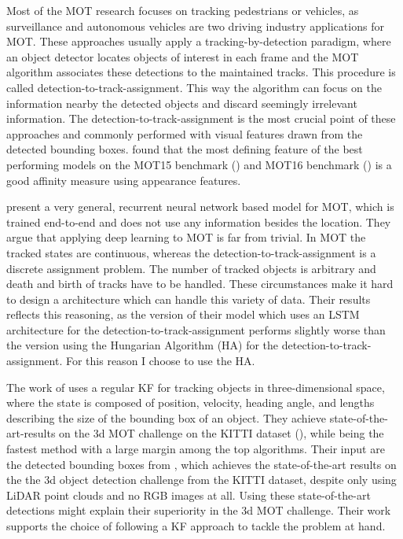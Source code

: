 \documentclass{article}
\begin{document}
Most of the MOT research focuses on tracking pedestrians or vehicles, as surveillance and autonomous vehicles are two driving industry applications for MOT. These approaches usually apply a tracking-by-detection paradigm, where an object detector locates objects of interest in each frame and the MOT algorithm associates these detections to the maintained tracks. This procedure is called detection-to-track-assignment. This way the algorithm can focus on the information nearby the detected objects and discard seemingly irrelevant information. The detection-to-track-assignment is the most crucial point of these approaches and commonly performed with visual features drawn from the detected bounding boxes. \cite{tracking_the_trackers} found  that the most defining feature of the best performing models on the MOT15 benchmark (\cite{MOT15}) and MOT16 benchmark (\cite{MOT16}) is a good affinity measure using appearance features.


\cite{milan_rnn_tracking} present a very general, recurrent neural network based model for MOT, which is trained end-to-end and does not use any information besides the location. They argue that applying deep learning to MOT is far from trivial. In MOT the tracked states are continuous, whereas the detection-to-track-assignment is a discrete assignment problem. The number of tracked objects is arbitrary and death and birth of tracks have to be handled. These circumstances make it hard to design a architecture which can handle this variety of data. Their results reflects this reasoning, as the version of their model which uses an LSTM architecture for the detection-to-track-assignment performs slightly worse than the version using the Hungarian Algorithm (HA) for the detection-to-track-assignment. For this reason I choose to use the HA.

The work of \cite{3d_kalman}  uses a regular KF for tracking objects in three-dimensional space, where the state is composed of position, velocity, heading angle, and lengths describing the size of the bounding box of an object. They achieve state-of-the-art-results on the 3d MOT challenge on the KITTI dataset (\cite{kitti}), while being the fastest method with a large margin among the top algorithms. Their input are the detected bounding boxes from \cite{PointRCNN}, which achieves the state-of-the-art results on the the 3d object detection challenge from the KITTI dataset, despite only using LiDAR point clouds and no RGB images at all. Using these state-of-the-art detections might explain their superiority in the 3d MOT challenge. Their work supports the choice of following a KF approach to tackle the problem at hand.
\end{document}
